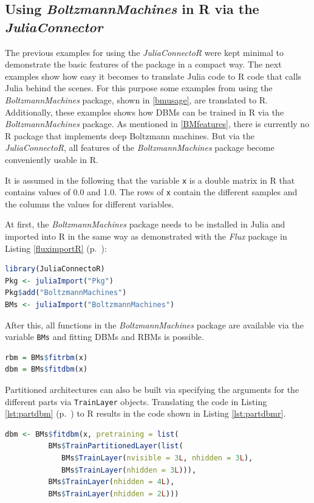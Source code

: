 \documentclass[12pt]{article}
\newcommand{\inlinecode}[1]{\texttt{#1}}
\newcommand{\apkg}[1]{\emph{#1}}
\begin{document}
\subsection{Using \apkg{BoltzmannMachines} in R via the \apkg{JuliaConnector}}\label{juliaconnectorDbmexample}
The previous examples for using the \apkg{JuliaConnectoR} were kept minimal to demonstrate the basic features of the package in a compact way.
The next examples show how easy it becomes to translate Julia code to R code that calls Julia behind the scenes.
For this purpose some examples from using the \apkg{BoltzmannMachines} package, shown in \ref{bmusage}, are translated to R.
Additionally, these examples shows how DBMs can be trained in R via the \apkg{BoltzmannMachines} package.
As mentioned in \ref{BMfeatures}, there is currently no R package that implements deep Boltzmann machines.
But via the \apkg{JuliaConnectoR}, all features of the \apkg{BoltzmannMachines} package become conveniently usable in R.

It is assumed in the following that the variable \inlinecode{x} is a double matrix in R that contains values of 0.0 and 1.0.
The rows of \inlinecode{x} contain the different samples and the columns the values for different variables.

At first, the \apkg{BoltzmannMachines} package needs to be installed in Julia and imported into R in the same way as demonstrated with the \apkg{Flux} package in Listing \ref{fluximportR} (p.~\pageref{fluximportR}):

\begin{lstlisting}[language=R, float=!h]
library(JuliaConnectoR)
Pkg <- juliaImport("Pkg")
Pkg$add("BoltzmannMachines")
BMs <- juliaImport("BoltzmannMachines")
\end{lstlisting}

After this, all functions in the \apkg{BoltzmannMachines} package are available via the variable \inlinecode{BMs} and fitting DBMs and RBMs is possible.

\begin{lstlisting}[language=R, float=!h]
rbm = BMs$fitrbm(x)
dbm = BMs$fitdbm(x)
\end{lstlisting}
 
Partitioned architectures can also be built via specifying the arguments for the different parts via \inlinecode{TrainLayer} objects.
Translating the code in Listing \ref{lst:partdbm} (p.~\pageref{lst:partdbm}) to R results in the code shown in Listing \ref{lst:partdbmr}.

\begin{lstlisting}[language=R,caption={Fitting a partitioned DBM in R via the \apkg{JuliaConnectoR}},label={lst:partdbmr}, float=!h]
dbm <- BMs$fitdbm(x, pretraining = list(
          BMs$TrainPartitionedLayer(list(
             BMs$TrainLayer(nvisible = 3L, nhidden = 3L),
             BMs$TrainLayer(nhidden = 3L))),
          BMs$TrainLayer(nhidden = 4L),
          BMs$TrainLayer(nhidden = 2L)))
\end{lstlisting}
\end{document}
